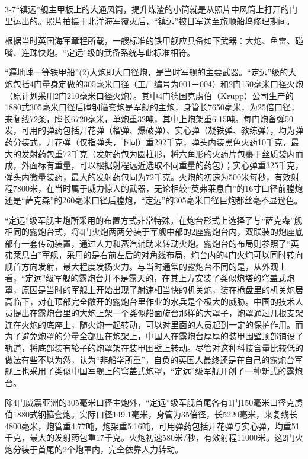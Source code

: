 \documentclass[12pt,UTF8]{ctexbook}
\begin{document}
3-7“镇远”舰主甲板上的大通风筒，提升煤渣的小筒就是从照片中风筒上打开的门里运出的。照片拍摄于北洋海军覆灭后，“镇远”被日军送至旅顺船坞修理期间。

根据当时英国海军章程所载，一艘标准的铁甲舰应具备如下武器：大炮、鱼雷、碰嘴、连珠快炮。“定远”级的武备系统与此标准相符。

“遍地球一等铁甲船”(2)大炮即大口径炮，是当时军舰的主要武器。“定远”级的大炮包括4门量身定做的305毫米口径（工厂编号为001－004）和2门150毫米口径火炮（原计划采用2门210毫米口径火炮）。其中4门德国克虏伯（Krupp）公司生产的1880式305毫米口径后膛钢箍套炮是军舰的主炮，身管长7650毫米，为25倍口径，来复线72条，膛长6720毫米，单炮重32吨，其中上炮架重6.15吨。每门炮备弹50发，可用的弹药包括开花弹（榴弹、爆破弹）、实心弹（凝铁弹、教练弹），均为弹药分装式，开花弹（仅指弹头，下同）重292千克，弹头内装黑色火药10千克，最大的发射药包重72千克（发射药包为圆柱形，将六角形的火药片包裹于丝质袋内而成，外面标有重量，可以根据射程远近选取不同重量的药包）；实心弹重325千克，弹头内微量装药，最大的发射药包同为72千克。火炮的初速为500米每秒，有效射程7800米，在当时属于威力惊人的武器，无论相较“英弗莱息白”的16寸口径前膛炮还是“萨克森”的260毫米口径后膛炮，“定远”的305毫米口径巨炮都丝毫不显逊色。

“定远”级军舰主炮所采用的布置方式非常特殊，在炮台形式上选择了与“萨克森”舰相同的露炮台式，将4门火炮两两分装于军舰中部的2座露炮台内，双联装的炮座底部有一套传动装置，通过人力和蒸汽辅助来转动火炮。露炮台的布局则参照了“英弗莱息白”军舰，采用的是右前左后的对角线布局，炮台内的4门火炮可以同时转向舰首方向发射，最大程度发扬火力。与当时通常的露炮台不同的是，从外观上看，“定远”级军舰的露炮台并不是露天的，在其上方安装了类似炮塔的穹盖式炮罩，原因是当时的军舰上开始出现了射速相当快的机关炮，装在桅盘里的机关炮居高临下，对在顶部完全敞开的露炮台里作业的水兵是个极大的威胁。中国的技术人员提出在露炮台里的大炮上架一个类似船面旋台那样的大罩子，炮罩通过几根支架连在火炮的底座上，随火炮一起转动，可以对里面的人员起到一定的保护作用。而为了避免炮罩的分量全部压在炮架上，中国人在露炮台厚厚的装甲围壁顶部铺设了轨道，将底部装有轮子的炮罩架在装甲围壁上转动。尽管对这种科技含量比较低的做法有些不以为然，认为“非船学所重”，自负的英国人最终还是在自己的露炮台军舰上也采用了类似中国军舰上的穹盖式炮罩，“定远”级军舰开创了一种新式的露炮台。

除4门威震亚洲的305毫米口径主炮外，“定远”级军舰首尾各有1门150毫米口径克虏伯1880式钢箍套炮。实际口径149.1毫米，身管为35倍径，长5220毫米，来复线长4800毫米，炮管重4.77吨，炮架重5.16吨，可用弹药包括开花弹与实心弹，均重51千克，最大的发射药包重17千克。火炮初速580米/秒，有效射程11000米。这2门火炮分装于首尾的2个炮罩内，完全依靠人力转动。
\end{document}
